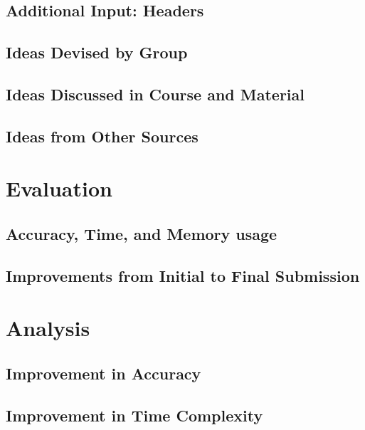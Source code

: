 \documentclass[journal, a4paper]{IEEEtran}
\begin{document}
\subsection{Additional Input: Headers}

\subsection{Ideas Devised by Group}




\subsection{Ideas Discussed in Course and Material}


\subsection{Ideas from Other Sources}

\section{Evaluation}

\subsection{Accuracy, Time, and Memory usage}

\subsection{Improvements from Initial to Final Submission}
	
\section{Analysis}

\subsection{Improvement in Accuracy}

\subsection{Improvement in Time Complexity}
\end{document}
